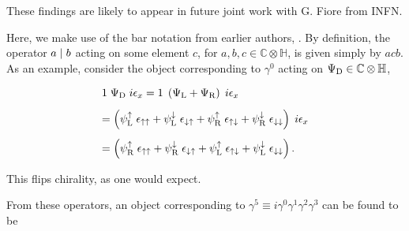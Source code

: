 \documentclass[letterpaper,12pt,titlepage,oneside,final]{book}
\newcommand{\CH}{\mathbb{C}\otimes\mathbb{H}}
\begin{document}
\noindent These findings are likely to appear in future joint work with G. Fiore from INFN.  

Here, we make use of the bar notation from earlier authors, \cite{deleoGUT}.  By definition, the operator $a\hspace{1mm} | \hspace{1mm} b$ acting on some element $c$, for $a,b,c\in\CH$, is given simply by $acb$.  As an example, consider the object corresponding to $\gamma^0$  acting on $\Psi_{\textup{D}}\in\CH$,

\begin{equation} \begin{array}{l}    1\hspace{1mm}  \Psi_{\textup{D}} \hspace{1mm} i{\epsilon_x}  =  1\hspace{1mm} \left( \Psi_{\textup{L}}+ \Psi_{\textup{R}}\right) \hspace{1mm} i{\epsilon_x}\vspace{3mm}\\ =  \left( \psi^{\uparrow}_{\textup{L}} \hspace{1mm} \epsilon_{\uparrow \uparrow} +  \psi^{\downarrow}_{\textup{L}} \hspace{1mm} \epsilon_{\downarrow \uparrow}  + \psi^{\uparrow}_{\textup{R}} \hspace{1mm} \epsilon_{\uparrow \downarrow} +  \psi^{\downarrow}_{\textup{R}} \hspace{1mm} \epsilon_{\downarrow \downarrow}  \right)  \hspace{1mm} i{\epsilon_x}\vspace{3mm}\\   = \left( \psi^{\uparrow}_{\textup{R}} \hspace{1mm} \epsilon_{\uparrow \uparrow} +  \psi^{\downarrow}_{\textup{R}} \hspace{1mm} \epsilon_{\downarrow \uparrow}  + \psi^{\uparrow}_{\textup{L}} \hspace{1mm} \epsilon_{\uparrow \downarrow} +  \psi^{\downarrow}_{\textup{L}} \hspace{1mm} \epsilon_{\downarrow \downarrow}  \right).
\end{array}\end{equation}  

\noindent This flips chirality, as one would expect.  

From these operators, an object corresponding to $\gamma^5 \equiv i\gamma^0\gamma^1\gamma^2\gamma^3$ can be found to be 
\end{document}

